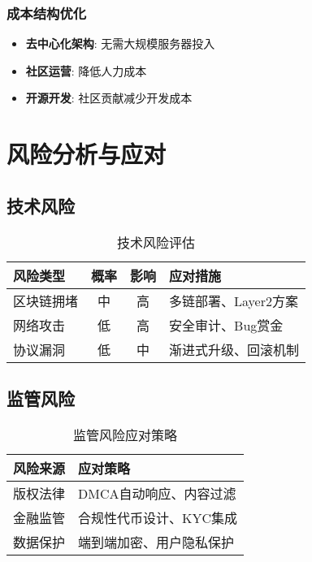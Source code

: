 \documentclass[12pt,a4paper]{article}
\begin{document}
\subsubsection{成本结构优化}
\begin{itemize}
    \item \textbf{去中心化架构}: 无需大规模服务器投入
    \item \textbf{社区运营}: 降低人力成本
    \item \textbf{开源开发}: 社区贡献减少开发成本
\end{itemize}

\section{风险分析与应对}

\subsection{技术风险}

\begin{table}[h]
\centering
\begin{tabular}{|l|c|c|l|}
\hline
\textbf{风险类型} & \textbf{概率} & \textbf{影响} & \textbf{应对措施} \\
\hline
区块链拥堵 & 中 & 高 & 多链部署、Layer2方案 \\
\hline
网络攻击 & 低 & 高 & 安全审计、Bug赏金 \\
\hline
协议漏洞 & 低 & 中 & 渐进式升级、回滚机制 \\
\hline
\end{tabular}
\caption{技术风险评估}
\end{table}

\subsection{监管风险}

\begin{table}[h]
\centering
\begin{tabular}{|l|l|}
\hline
\textbf{风险来源} & \textbf{应对策略} \\
\hline
版权法律 & DMCA自动响应、内容过滤 \\
\hline
金融监管 & 合规性代币设计、KYC集成 \\
\hline
数据保护 & 端到端加密、用户隐私保护 \\
\hline
\end{tabular}
\caption{监管风险应对策略}
\end{table}
\end{document}
